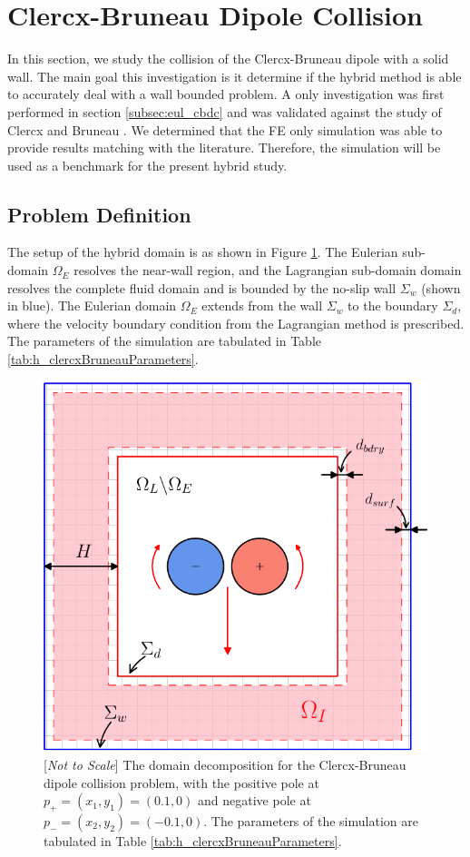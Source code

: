 \section{Clercx-Bruneau Dipole Collision}
\label{sec:vvhm-cbdcoll}

In this section, we study the collision of the Clercx-Bruneau dipole with a solid wall. The main goal this investigation is it determine if the hybrid method is able to accurately deal with a wall bounded problem. A  only investigation was first performed in section \ref{subsec:eul_cbdc} and was validated against the study of Clercx and Bruneau \cite{Clercx2006a}. We determined that the FE only simulation was able to provide results matching with the literature. Therefore, the simulation will be used as a benchmark for the present hybrid study.

\subsection{Problem Definition}

The setup of the hybrid domain is as shown in Figure \ref{fig:hcbdc_dd}. The Eulerian sub-domain $\Omega_E$ resolves the near-wall region, and the Lagrangian sub-domain domain resolves the complete fluid domain and is bounded by the no-slip wall $\Sigma_{w}$ (shown in blue). The Eulerian domain $\Omega_E$ extends from the wall $\Sigma_{w}$ to the boundary $\Sigma_{d}$, where the velocity boundary condition from the Lagrangian method is prescribed. The parameters of the simulation are tabulated in Table \ref{tab:h_clercxBruneauParameters}.

	\begin{figure}[!p]
	\centering
	\includegraphics[width=0.6\linewidth]{./figures/validation/cbColl/hcbdc_dd-crop.pdf}
	\caption{[\textit{Not to Scale}] The domain decomposition for the Clercx-Bruneau dipole collision problem, with the positive pole at $p_{+}=(x_1,y_1) = (0.1,0)$ and negative pole at $p_{-}=(x_2,y_2)=(-0.1,0)$. The parameters of the simulation are tabulated in Table \ref{tab:h_clercxBruneauParameters}.}
	\label{fig:hcbdc_dd}
	\end{figure}

